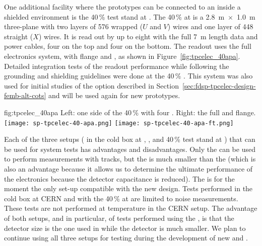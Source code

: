 One additional facility where the  prototypes can be connected to
an  inside a shielded environment is the \num{40}\,\%  
test stand at . The \num{40}\,\%  at  is a \SI{2.8}{m}~$\times$~\SI{1.0}{m} 
three-plane  with two layers of \num{576} wrapped ($U$ and $V$) wires 
and one layer of \num{448} straight ($X$) wires. It is read out by up to eight 
 with the full \SI{7}{m}  length data and  power 
cables, four on the top and four on the bottom. The readout uses the full  electronics 
system, with  flange and , as shown in Figure~\ref{fig:tpcelec_40apa}. 
Detailed integration tests of the   readout performance while 
following the  grounding and shielding guidelines were done at the \num{40}\,\% 
. This system was also used for initial studies of the  
option described in Section~\ref{sec:fdsp-tpcelec-design-femb-alt-cots} and will
be used again for new  prototypes.

\begin{dunefigure}
{fig:tpcelec_40apa}
{Left: one side of the \num{40}\,\%  with four .  Right: the full  \fdth and flange.}
\texttt{[image: sp-tpcelec-40-apa.png]}
\hspace{3mm}
\texttt{[image: sp-tpcelec-40-apa-ft.png]}
\end{dunefigure}

Each of the three setups ( in the cold box at ,  ,
and \num{40}\,\%  test stand at ) that can be used for system tests has advantages
and disadvantages. Only the   can be used to 
perform measurements with tracks, but the  is 
much smaller than the    (which is also an advantage because it
allows us to determine the ultimate performance of the electronics because
the detector capacitance is reduced). The  
is for the moment the only set-up compatible with the new 
design. Tests performed in the cold box at CERN and with the \num{40}\,\%  
at  are limited to noise measurements. These tests are not
performed at  temperature in the CERN setup. The advantage of
both setups, and in particular, of tests performed using the 
, is that the detector size is the one used in  
while the  detector is much smaller. We plan to continue
using all three setups for testing during the development of 
new  and .

